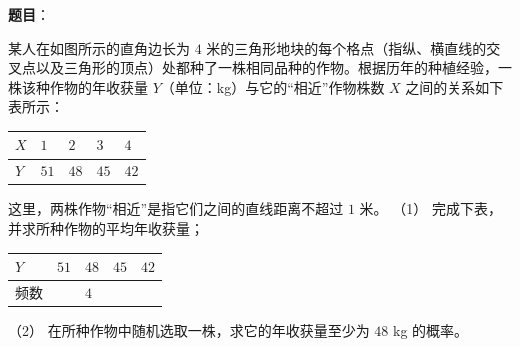 \begin{answer}

\textbf{题目}：

某人在如图所示的直角边长为 $4$ 米的三角形地块的每个格点（指纵、横直线的交叉点以及三角形的顶点）处都种了一株相同品种的作物。根据历年的种植经验，一株该种作物的年收获量 $Y$（单位：kg）与它的“相近”作物株数 $X$ 之间的关系如下表所示：
\nopagebreak[4]
\begin{center}\end{center}
\nopagebreak[4]
\begin{center}
\begin{tabular}{lllll}
\toprule
$X$ & $1$ & $2$ & $3$ & $4$ \\
\midrule
$Y$ & $51$ & $48$ & $45$ & $42$ \\
\bottomrule
\end{tabular}
\end{center}
这里，两株作物“相近”是指它们之间的直线距离不超过 $1$ 米。
（1） 完成下表，并求所种作物的平均年收获量；
\begin{center}
\begin{tabular}{lllll}
\toprule
$Y$ & $51$ & $48$ & $45$ & $42$ \\
\midrule
频数 &  & $4$ &  &  \\
\bottomrule
\end{tabular}
\end{center}
（2） 在所种作物中随机选取一株，求它的年收获量至少为 $48$ kg 的概率。


\end{answer}
